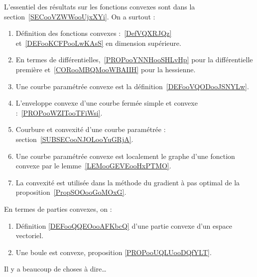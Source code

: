 
L'essentiel des résultats sur les fonctions convexes sont dans la section~\ref{SECooVZWWooUjxXYi}. On a surtout :
\begin{enumerate}
    \item
        Définition des fonctions convexes :~\ref{DefVQXRJQz} et~\ref{DEFooKCFPooLwKAsS} en dimension supérieure.
    \item
        En termes de différentielles,~\ref{PROPooYNNHooSHLvHp} pour la différentielle première et~\ref{CORooMBQMooWBAIIH} pour la hessienne.
    \item
        Une courbe paramétrée convexe est la définition~\ref{DEFooVQODooJSNYLw}.
    \item
        L'enveloppe convexe d'une courbe fermée simple et convexe :~\ref{PROPooWZITooTFiWsi}.
    \item
        Courbure et convexité d'une courbe paramétrée : section~\ref{SUBSECooNJOLooYuGRjA}.
    \item
        Une courbe paramétrée convexe est localement le graphe d'une fonction convexe par le lemme~\ref{LEMooGEVEooHxPTMO}.
    \item
        La convexité est utilisée dans la méthode du gradient à pas optimal de la proposition~\ref{PropSOOooGoMOxG}.
\end{enumerate}

En termes de parties convexes, on : 
\begin{enumerate}
    \item
        Définition \ref{DEFooQQEOooAFKbcQ} d'une partie convexe d'un espace vectoriel.
    \item
        Une boule est convexe, proposition \ref{PROPooUQLUooDQfYLT}.
\end{enumerate}


      \label{THEMEooBSBLooWcaQnR}

Il y a beaucoup de choses à dire\ldots

